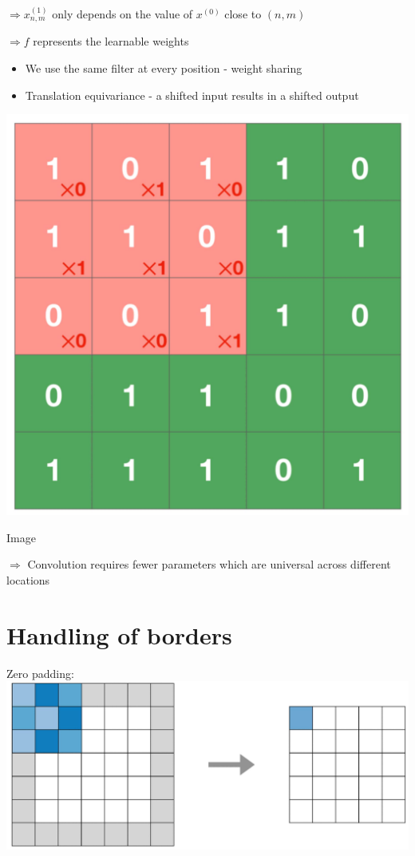 \documentclass[10pt]{article}
\begin{document}
$\Rightarrow x_{n, m}^{(1)}$ only depends on the value of $x^{(0)}$ close to $(n, m)$

$\Rightarrow f$ represents the learnable weights

\begin{itemize}
  \item We use the same filter at every position - weight sharing

  \item Translation equivariance - a shifted input results in a shifted output

\end{itemize}

\begin{center}
\includegraphics[max width=\textwidth]{2024_01_08_959e2db67a31f073f6d2g-05}
\end{center}

Image

$\Rightarrow$ Convolution requires fewer parameters which are universal across different locations

\section*{Handling of borders}
Zero padding:
\includegraphics[max width=\textwidth, center]{2024_01_08_959e2db67a31f073f6d2g-06(1)}
\end{document}
